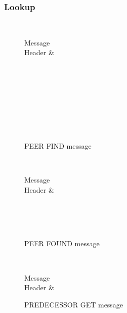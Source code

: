 \documentclass[a4paper, 11pt]{article}
\begin{document}
\subsubsection*{Lookup}

\begin{figure}[h!]
	\centering
	\begin{bytefield}[bitwidth=0.8em]{32}
		 \\
		\begin{rightwordgroup}{Message \\  Header}
			 & 
		\end{rightwordgroup} \\
		 \\
		\skippedwords \\
		 \\
		 \\
		\skippedwords \\
		 \\
	\end{bytefield}
	\caption{PEER FIND message}
	\label{PEERFIND}
\end{figure}

\begin{figure}[h!]
	\centering
	\begin{bytefield}[bitwidth=0.8em]{32}
		 \\
		\begin{rightwordgroup}{Message \\  Header}
			 & 
		\end{rightwordgroup} \\
		 \\
		\skippedwords \\
	\end{bytefield}
	\caption{PEER FOUND message}
	\label{PEERFOUND}
\end{figure}

\begin{figure}[h!]
	\centering
	\begin{bytefield}[bitwidth=0.8em]{32}
		 \\
		\begin{rightwordgroup}{Message \\  Header}
			 & 
		\end{rightwordgroup}
	\end{bytefield}
	\caption{PREDECESSOR GET message}
	\label{PREDECESSORGET}
\end{figure}
\end{document}
